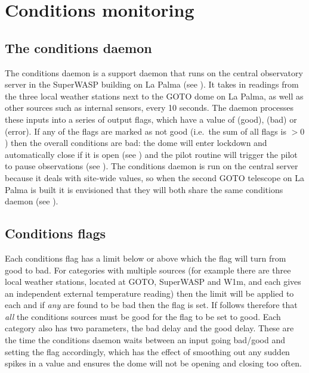 \section{Conditions monitoring}
\label{sec:conditions}
\begin{colsection}


\begin{colsection}


\end{colsection}

\subsection{The conditions daemon}
\label{sec:conditions_daemon}
\begin{colsection}

The conditions daemon is a support daemon that runs on the central observatory server in the SuperWASP building on La Palma (see ). It takes in readings from the three local weather stations next to the GOTO dome on La Palma, as well as other sources such as internal sensors, every 10 seconds. The daemon processes these inputs into a series of output flags, which have a value of  (good),  (bad) or  (error). If any of the flags are marked as not good (i.e.\ the sum of all flags is $>0$) then the overall conditions are bad: the dome will enter lockdown and automatically close if it is open (see ) and the pilot  routine will trigger the pilot to pause observations (see ). The conditions daemon is run on the central server because it deals with site-wide values, so when the second GOTO telescope on La Palma is built it is envisioned that they will both share the same conditions daemon (see ).

\end{colsection}

\subsection{Conditions flags}
\label{sec:conditions_flags}
\begin{colsection}

Each conditions flag has a limit below or above which the flag will turn from good to bad. For categories with multiple sources (for example there are three local weather stations, located at GOTO, SuperWASP and W1m, and each gives an independent external temperature reading) then the limit will be applied to each and if \textit{any} are found to be bad then the flag is set. If follows therefore that \textit{all} the conditions sources must be good for the flag to be set to good. Each category also has two parameters, the bad delay and the good delay. These are the time the conditions daemon waits between an input going bad/good and setting the flag accordingly, which has the effect of smoothing out any sudden spikes in a value and ensures the dome will not be opening and closing too often.


\end{colsection}
\end{colsection}
